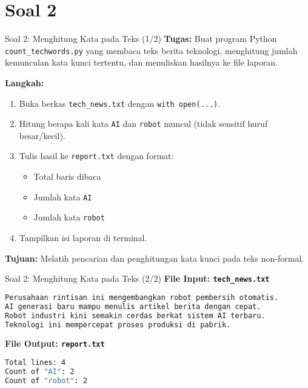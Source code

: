\documentclass[aspectratio=169, table]{beamer}
\begin{document}
\section{Soal 2}
\begin{frame}[fragile]{Soal 2: Menghitung Kata pada Teks (1/2)}
\vspace{15pt}
\textbf{Tugas:}  
Buat program Python \texttt{count\_techwords.py} yang membaca teks berita teknologi, menghitung jumlah kemunculan kata kunci tertentu, dan menuliskan hasilnya ke file laporan.

\textbf{Langkah:}
\begin{enumerate}
  \item Buka berkas \texttt{tech\_news.txt} dengan \texttt{with open(...)}.
  \item Hitung berapa kali kata \texttt{AI} dan \texttt{robot} muncul  
        (tidak sensitif huruf besar/kecil).
  \item Tulis hasil ke \texttt{report.txt} dengan format:
        \begin{itemize}
          \item Total baris dibaca
          \item Jumlah kata \texttt{AI}
          \item Jumlah kata \texttt{robot}
        \end{itemize}
  \item Tampilkan isi laporan di terminal.
\end{enumerate}
\textbf{Tujuan:}  
Melatih pencarian dan penghitungan kata kunci pada teks non-formal.
\end{frame}

\begin{frame}[fragile]{Soal 2: Menghitung Kata pada Teks (2/2)}
\vspace{15pt}
\textbf{File Input: \texttt{tech\_news.txt}}
\begin{lstlisting}[language=bash,basicstyle=\ttfamily\small]
Perusahaan rintisan ini mengembangkan robot pembersih otomatis.
AI generasi baru mampu menulis artikel berita dengan cepat.
Robot industri kini semakin cerdas berkat sistem AI terbaru.
Teknologi ini mempercepat proses produksi di pabrik.
\end{lstlisting}

\textbf{File Output: \texttt{report.txt}}
\begin{lstlisting}[language=bash,basicstyle=\ttfamily\small]
Total lines: 4
Count of "AI": 2
Count of "robot": 2
\end{lstlisting}
\end{frame}
\end{document}
